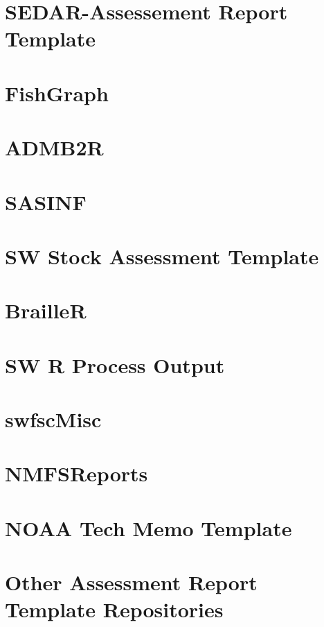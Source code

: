 \documentclass[
  letterpaper,
  oneside,
  open=any]{scrbook}
\begin{document}
\section{SEDAR-Assessement Report Template}\label{sec-sedartemplate}

\section{FishGraph}\label{sec-fishgraph}

\section{ADMB2R}\label{sec-admb2r}

\section{SASINF}\label{sec-sasinf}

\section{SW Stock Assessment Template}\label{sec-swfsctemplate}

\section{BrailleR}\label{sec-brailler}

\section{SW R Process Output}\label{sec-swroutput}

\section{swfscMisc}\label{sec-swfscmisc}

\section{NMFSReports}\label{sec-nmfsreports}

\section{NOAA Tech Memo Template}\label{sec-noaatechmemo}

\section{Other Assessment Report Template
Repositories}\label{sec-othertemplates}
\end{document}
